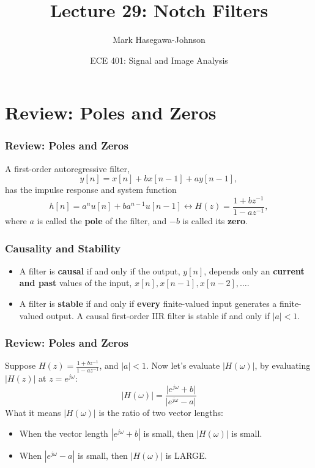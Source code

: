 \documentclass{beamer}
\title{Lecture 29: Notch Filters}
\author{Mark Hasegawa-Johnson}
\date{ECE 401: Signal and Image Analysis}
\begin{document}
\begin{frame}
  \maketitle
\end{frame}

\begin{frame}
  \tableofcontents
\end{frame}

\section[Review]{Review: Poles and Zeros}
\setcounter{subsection}{1}

\begin{frame}
  \frametitle{Review: Poles and Zeros}
  A first-order autoregressive filter,
  \[
  y[n] = x[n]+bx[n-1]+ay[n-1],
  \]
  has the impulse response and system function
  \[
  h[n]=a^n u[n]+ba^{n-1}u[n-1] \leftrightarrow H(z)  = \frac{1+bz^{-1}}{1-az^{-1}},
  \]
  where $a$ is called the {\bf pole} of the filter, and $-b$ is called
  its {\bf zero}.
\end{frame}

\begin{frame}
  \frametitle{Causality and Stability}
  \begin{itemize}
  \item A filter is {\bf causal} if and only if the output, $y[n]$,
    depends only an {\bf current and past} values of the input, $x[n],
    x[n-1],x[n-2],\ldots$.
  \item A filter is {\bf stable} if and only if {\bf every}
    finite-valued input generates a finite-valued output.  A causal
    first-order IIR filter is stable if and only if $|a|<1$.
  \end{itemize}
\end{frame}

\begin{frame}
  \frametitle{Review: Poles and Zeros}

  Suppose $H(z)=\frac{1+bz^{-1}}{1-az^{-1}}$, and $|a|<1$.  Now let's
  evaluate $|H(\omega)|$, by evaluating $|H(z)|$ at $z=e^{j\omega}$:
  \[
  \vert H(\omega)\vert = 
  \frac{\vert e^{j\omega}+b\vert}{\vert e^{j\omega}-a\vert}
  \]
  What it means $|H(\omega)|$ is the ratio of two vector lengths:
  \begin{itemize}
  \item When the vector length $|e^{j\omega}+b|$ is small, then
    $|H(\omega)|$ is small.
  \item When $|e^{j\omega}-a|$ is small, then $|H(\omega)|$ is LARGE.
  \end{itemize}
\end{frame}
\end{document}
